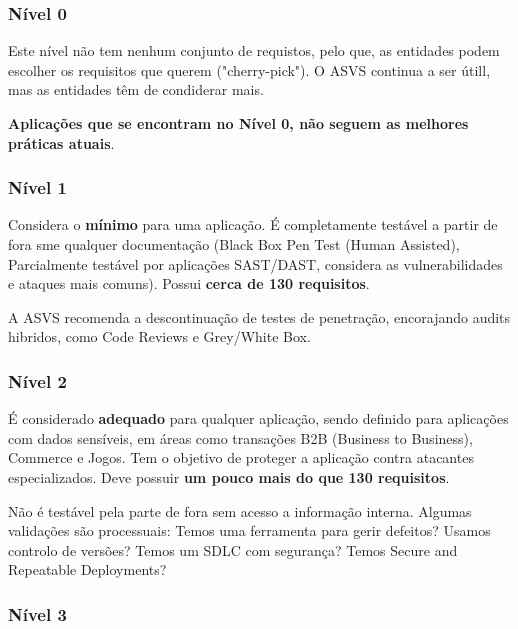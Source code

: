 \documentclass{article}
\begin{document}
\subsubsection*{Nível 0}

Este nível não tem nenhum conjunto de requistos, pelo que,
as entidades podem escolher os requisitos que querem ("cherry-pick").
O ASVS continua a ser útill, mas as entidades têm de condiderar mais.

\textbf{Aplicações que se encontram no Nível 0, não seguem as melhores
práticas atuais}.

\pagebreak

\subsubsection*{Nível 1}

Considera o \textbf{mínimo} para uma aplicação.
É completamente testável a partir de fora sme qualquer documentação
(Black Box Pen Test (Human Assisted), Parcialmente testável
por aplicações SAST/DAST, considera as vulnerabilidades e ataques
mais comuns).
Possui \textbf{cerca de 130 requisitos}.

\vspace{2mm}

A ASVS recomenda a descontinuação de testes de penetração, encorajando
audits hibridos, como Code Reviews e Grey/White Box.

\subsubsection*{Nível 2}

É considerado \textbf{adequado} para qualquer aplicação, sendo
definido para aplicações com dados sensíveis, em áreas como
transações B2B (Business to Business), Commerce e Jogos.
Tem o objetivo de proteger a aplicação contra atacantes
especializados. Deve possuir \textbf{um pouco mais do que 130 requisitos}.

\vspace{2mm}

Não é testável pela parte de fora sem acesso a informação interna.
Algumas validações são processuais: Temos uma ferramenta para
gerir defeitos? Usamos controlo de versões? Temos um SDLC com
segurança? Temos Secure and Repeatable Deployments?

\subsubsection*{Nível 3}
\end{document}
